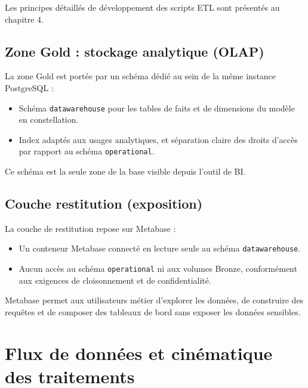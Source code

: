 \documentclass[12pt, a4paper]{report}
\begin{document}
Les principes détaillés de développement des scripts ETL sont présentés au chapitre 4.

\subsection{Zone Gold : stockage analytique (OLAP)}

La zone Gold est portée par un schéma dédié au sein de la même instance PostgreSQL :

\begin{itemize}[label=\textcolor{chuBlue}{\textbullet}]
  \item Schéma \texttt{datawarehouse} pour les tables de faits et de dimensions du modèle en constellation.
  \item Index adaptés aux usages analytiques, et séparation claire des droits d'accès par rapport au schéma \texttt{operational}.
\end{itemize}

Ce schéma est la seule zone de la base visible depuis l'outil de BI.

\subsection{Couche restitution (exposition)}

La couche de restitution repose sur Metabase :

\begin{itemize}[label=\textcolor{chuBlue}{\textbullet}]
  \item Un conteneur Metabase connecté en lecture seule au schéma \texttt{datawarehouse}.
  \item Aucun accès au schéma \texttt{operational} ni aux volumes Bronze, conformément aux exigences de cloisonnement et de confidentialité.
\end{itemize}

Metabase permet aux utilisateurs métier d'explorer les données, de construire des requêtes et de composer des tableaux de bord sans exposer les données sensibles.

\section{Flux de données et cinématique des traitements}
\end{document}
